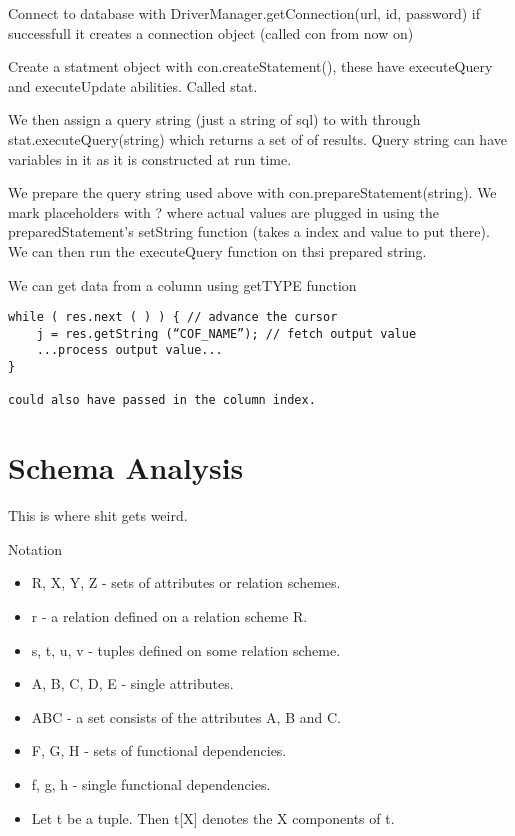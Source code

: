 \documentclass{article}
\begin{document}
Connect to database with DriverManager.getConnection(url, id, password) if successfull it creates a connection object (called con from now on)

Create a statment object with con.createStatement(), these have executeQuery and executeUpdate abilities. Called stat.

We then assign a query string (just a string of sql) to with through stat.executeQuery(string) which returns a set of of results. Query string can have variables in it as it is constructed at run time.

We prepare the query string used above with con.prepareStatement(string). We mark placeholders with ? where actual values are plugged in using the preparedStatement's setString function (takes a index and value to put there). We can then run the executeQuery function on thsi prepared string.

We can get data from a column using getTYPE function
\begin{verbatim}
while ( res.next ( ) ) { // advance the cursor
    j = res.getString (“COF_NAME”); // fetch output value
    ...process output value...
}

could also have passed in the column index.
\end{verbatim}

\section{Schema Analysis} %
\label{sec:schema_analysis}
This is where shit gets weird.

Notation
\begin{itemize}
    \item R, X, Y, Z - sets of attributes or relation schemes.
    \item r - a relation defined on a relation scheme R.
    \item s, t, u, v - tuples defined on some relation scheme.
    \item A, B, C, D, E - single attributes.
    \item ABC - a set consists of the attributes A, B and C.
    \item F, G, H - sets of functional dependencies.
    \item f, g, h - single functional dependencies.
    \item Let t be a tuple. Then t[X] denotes the X components of t.
\end{itemize}
\end{document}
